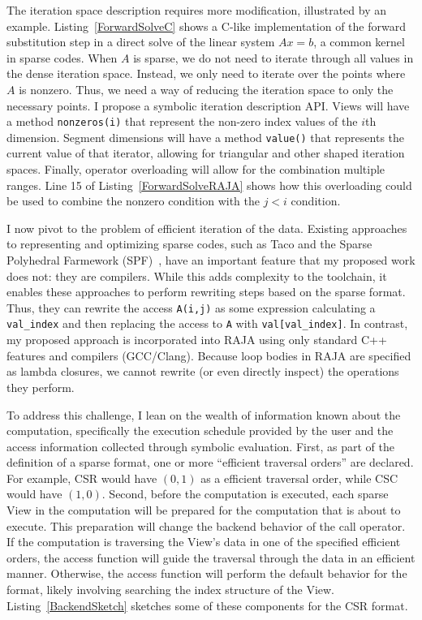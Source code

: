 \documentclass{article}
\begin{document}
The iteration space description requires more modification, illustrated by an example.
Listing~\ref{ForwardSolveC} shows a C-like implementation of the forward substitution step in a direct solve of the linear system $Ax=b$, a common kernel in sparse codes.
When $A$ is sparse, we do not need to iterate through all values in the dense iteration space.
Instead, we only need to iterate over the points where $A$ is nonzero. 
Thus, we need a way of reducing the iteration space to only the necessary points. 
I propose a symbolic iteration description API.
Views will have a method \verb.nonzeros(i). that represent the non-zero index values of the $i$th dimension. 
Segment dimensions will have a method \verb.value(). that represents the current value of that iterator, allowing for triangular and other shaped iteration spaces.
Finally, operator overloading will allow for the combination multiple ranges.
Line 15 of Listing~\ref{ForwardSolveRAJA} shows how this overloading could be used to combine the nonzero condition with the $j < i$ condition.

I now pivot to the problem of efficient iteration of the data.
Existing approaches to representing and optimizing sparse codes, such as Taco and the Sparse Polyhedral Farmework (SPF)~\cite{strout2016approach}, have an important feature that my proposed work does not: they are compilers.
While this adds complexity to the toolchain, it enables these approaches to perform rewriting steps based on the sparse format.
Thus, they can rewrite the access \verb.A(i,j). as some expression calculating a \verb.val_index. and then replacing the access to \verb.A. with \verb.val[val_index]..
In contrast, my proposed approach is incorporated into RAJA using only standard C++ features and compilers (GCC/Clang).
Because loop bodies in RAJA are specified as lambda closures, we cannot rewrite (or even directly inspect) the operations they perform.

To address this challenge, I lean on the wealth of information known about the computation, specifically the execution schedule provided by the user and the access information collected through symbolic evaluation. 
First, as part of the definition of a sparse format, one or more \enquote{efficient traversal orders} are declared. 
For example, CSR would have $(0,1)$ as a efficient traversal order, while CSC would have $(1,0)$.
Second, before the computation is executed, each sparse View in the computation will be prepared for the computation that is about to execute.
This preparation will change the backend behavior of the call operator.
If the computation is traversing the View's data in one of the specified efficient orders, the access function will guide the traversal through the data in an efficient manner.
Otherwise, the access function will perform the default behavior for the format, likely involving searching the index structure of the View.
Listing~\ref{BackendSketch} sketches some of these components for the CSR format. 
\end{document}
